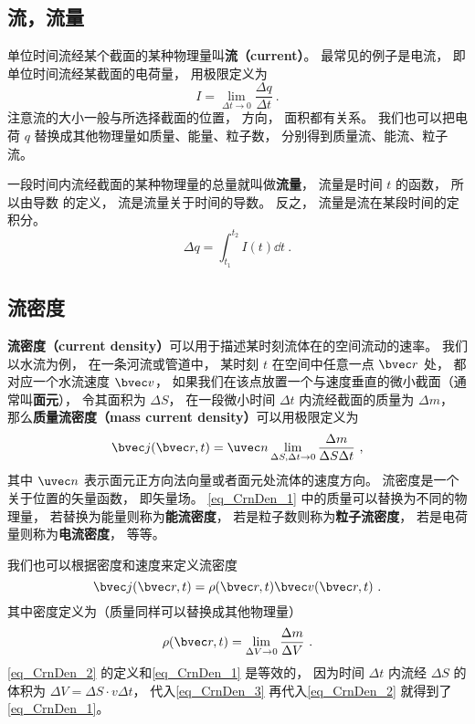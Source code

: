 

\subsection{流，流量}
单位时间流经某个截面的某种物理量叫\textbf{流（current）}。 最常见的例子是电流， 即单位时间流经某截面的电荷量， 用极限定义为
\begin{equation}
I = \lim_{\Delta t \to 0} \frac{\Delta q}{\Delta t}~.
\end{equation}
注意流的大小一般与所选择截面的位置， 方向， 面积都有关系。 我们也可以把电荷 $q$ 替换成其他物理量如质量、能量、粒子数， 分别得到质量流、能流、粒子流。

一段时间内流经截面的某种物理量的总量就叫做\textbf{流量}， 流量是时间 $t$ 的函数， 所以由导数 的定义， 流是流量关于时间的导数。 反之， 流量是流在某段时间的定积分。
\begin{equation}
\Delta q = \int_{t_1}^{t_2} I(t) \dd{t}~.
\end{equation}

\subsection{流密度}
\textbf{流密度（current density）}可以用于描述某时刻流体在的空间流动的速率。 我们以水流为例， 在一条河流或管道中， 某时刻 $t$ 在空间中任意一点 $\bvec r$ 处， 都对应一个水流速度 $\bvec v$， 如果我们在该点放置一个与速度垂直的微小截面（通常叫\textbf{面元}）， 令其面积为 $\Delta S$， 在一段微小时间 $\Delta t$ 内流经截面的质量为 $\Delta m$， 那么\textbf{质量流密度（mass current density）}可以用极限定义为
\begin{equation}\label{eq_CrnDen_1}
\bvec j(\bvec r, t) = \uvec n \lim_{\Delta S, \Delta t \to 0} \frac{\Delta m}{\Delta S \Delta t}~,
\end{equation}
其中 $\uvec n$ 表示面元正方向法向量或者面元处流体的速度方向。 流密度是一个关于位置的矢量函数， 即矢量场。 \autoref{eq_CrnDen_1} 中的质量可以替换为不同的物理量， 若替换为能量则称为\textbf{能流密度}， 若是粒子数则称为\textbf{粒子流密度}， 若是电荷量则称为\textbf{电流密度}， 等等。 

我们也可以根据密度和速度来定义流密度
\begin{equation}\label{eq_CrnDen_2}
\bvec j(\bvec r, t) = \rho(\bvec r, t) \bvec v(\bvec r, t)~.
\end{equation}
其中密度定义为（质量同样可以替换成其他物理量）
\begin{equation}\label{eq_CrnDen_3}
\rho(\bvec r, t) = \lim_{\Delta V\to 0} \frac{\Delta m}{\Delta V}~.
\end{equation}
\autoref{eq_CrnDen_2} 的定义和\autoref{eq_CrnDen_1} 是等效的， 因为时间 $\Delta t$ 内流经 $\Delta S$ 的体积为 $\Delta V = \Delta S \cdot v  \Delta t$， 代入\autoref{eq_CrnDen_3} 再代入\autoref{eq_CrnDen_2} 就得到了\autoref{eq_CrnDen_1}。

